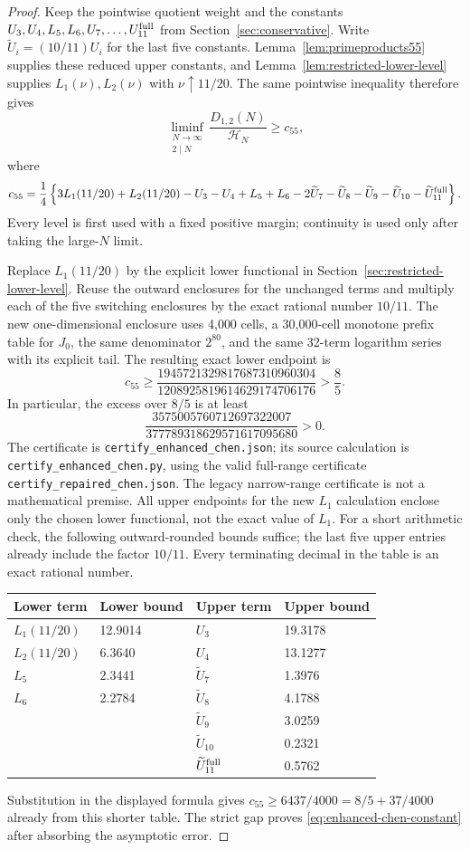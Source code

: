 \documentclass[11pt]{article}
\newcommand{\HN}{\mathcal H_N}
\begin{document}
\begin{proof}
Keep the pointwise quotient weight and the constants
$U_3,U_4,L_5,L_6,U_7,\ldots,U_{11}^{\rm full}$ from
Section~\ref{sec:conservative}. Write
$\widetilde U_i=(10/11)U_i$ for the last five constants.
Lemma~\ref{lem:primeproducts55} supplies these reduced upper constants,
and Lemma~\ref{lem:restricted-lower-level} supplies
$L_1(\nu),L_2(\nu)$ with $\nu\uparrow11/20$.
The same pointwise inequality therefore gives
\[
 \liminf_{\substack{N\to\infty\\2\mid N}}
       \frac{D_{1,2}(N)}{\HN}\ge c_{55},
\]
where
\[
 c_{55}=\frac14\left\{
 3L_1(11/20)+L_2(11/20)-U_3-U_4+L_5+L_6
 -2\widetilde U_7-\widetilde U_8-\widetilde U_9
 -\widetilde U_{10}-\widetilde U_{11}^{\rm full}\right\}.
\]
Every level is first used with a fixed positive margin; continuity
is used only after taking the large-$N$ limit.

Replace $L_1(11/20)$ by the explicit lower functional in
Section~\ref{sec:restricted-lower-level}. Reuse the outward enclosures
for the unchanged terms and multiply each of the five switching
enclosures by the exact rational number $10/11$.
The new one-dimensional enclosure uses 4,000 cells, a 30,000-cell
monotone prefix table for $J_0$, the same denominator $2^{80}$,
and the same 32-term logarithm series with its explicit tail.
The resulting exact lower endpoint is
\[
 c_{55}\ge
 \frac{1945721329817687310960304}{1208925819614629174706176}
 >\frac85.
\]
In particular, the excess over $8/5$ is at least
\[
 \frac{3575005760712697322007}{377789318629571617095680}>0.
\]
The certificate is \texttt{certify\_enhanced\_chen.json}; its source
calculation is \texttt{certify\_enhanced\_chen.py}, using the valid
full-range certificate \texttt{certify\_repaired\_chen.json}.
The legacy narrow-range certificate is not a mathematical premise.
All upper endpoints for the new $L_1$ calculation enclose only the
chosen lower functional, not the exact value of $L_1$.
For a short arithmetic check, the following outward-rounded bounds
suffice; the last five upper entries already include the factor $10/11$.
Every terminating decimal in the table is an exact rational number.
\begin{center}
\begin{tabular}{ll@{\qquad}ll}
\toprule
Lower term&Lower bound&Upper term&Upper bound\\
\midrule
$L_1(11/20)$&12.9014&$U_3$&19.3178\\
$L_2(11/20)$&6.3640&$U_4$&13.1277\\
$L_5$&2.3441&$\widetilde U_7$&1.3976\\
$L_6$&2.2784&$\widetilde U_8$&4.1788\\
&&$\widetilde U_9$&3.0259\\
&&$\widetilde U_{10}$&0.2321\\
&&$\widetilde U_{11}^{\rm full}$&0.5762\\
\bottomrule
\end{tabular}
\end{center}
Substitution in the displayed formula gives
$c_{55}\ge6437/4000=8/5+37/4000$ already from this shorter table.
The strict gap proves \eqref{eq:enhanced-chen-constant} after absorbing
the asymptotic error.


\end{proof}
\end{document}
